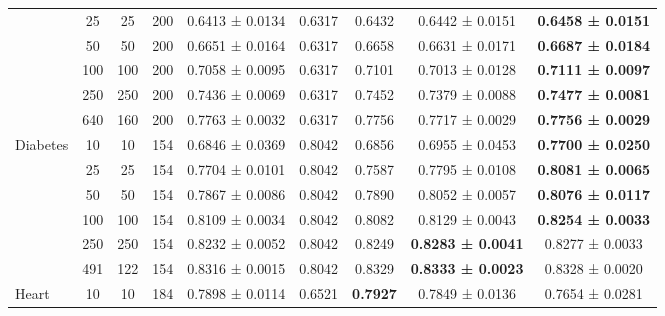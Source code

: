 \begin{table}
{\begin{tabular}[H]{@{}lcccccccc@{}}
                              & 25    & 25   & 200  & 0.6413 ± 0.0134      & 0.6317               & 0.6432          & 0.6442 ± 0.0151          & \textbf{0.6458 ± 0.0151} \\
                              & 50    & 50   & 200  & 0.6651 ± 0.0164      & 0.6317               & 0.6658          & 0.6631 ± 0.0171          & \textbf{0.6687 ± 0.0184} \\
                              & 100   & 100  & 200  & 0.7058 ± 0.0095      & 0.6317               & 0.7101          & 0.7013 ± 0.0128          & \textbf{0.7111 ± 0.0097} \\
                              & 250   & 250  & 200  & 0.7436 ± 0.0069      & 0.6317               & 0.7452          & 0.7379 ± 0.0088          & \textbf{0.7477 ± 0.0081} \\
                              & 640   & 160  & 200  & 0.7763 ± 0.0032      & 0.6317               & 0.7756          & 0.7717 ± 0.0029          & \textbf{0.7756 ± 0.0029} \\
                              \midrule
\multirow{6}{*}{Diabetes}     & 10    & 10   & 154  & 0.6846 ± 0.0369      & 0.8042               & 0.6856          & 0.6955 ± 0.0453          & \textbf{0.7700 ± 0.0250} \\
                              & 25    & 25   & 154  & 0.7704 ± 0.0101      & 0.8042               & 0.7587          & 0.7795 ± 0.0108          & \textbf{0.8081 ± 0.0065} \\
                              & 50    & 50   & 154  & 0.7867 ± 0.0086      & 0.8042               & 0.7890          & 0.8052 ± 0.0057          & \textbf{0.8076 ± 0.0117} \\
                              & 100   & 100  & 154  & 0.8109 ± 0.0034      & 0.8042               & 0.8082          & 0.8129 ± 0.0043          & \textbf{0.8254 ± 0.0033} \\
                              & 250   & 250  & 154  & 0.8232 ± 0.0052      & 0.8042               & 0.8249          & \textbf{0.8283 ± 0.0041} & 0.8277 ± 0.0033          \\
                              & 491   & 122  & 154  & 0.8316 ± 0.0015      & 0.8042               & 0.8329          & \textbf{0.8333 ± 0.0023} & 0.8328 ± 0.0020          \\
                              \midrule
\multirow{6}{*}{Heart}        & 10    & 10   & 184  & 0.7898 ± 0.0114      & 0.6521               & \textbf{0.7927} & 0.7849 ± 0.0136          & 0.7654 ± 0.0281          \\

\end{tabular}}
\end{table}
